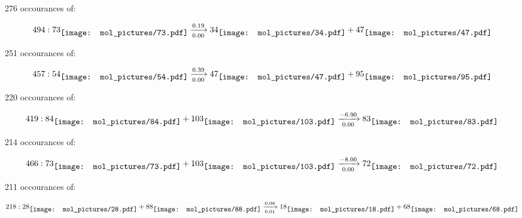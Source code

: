 \documentclass{article}
\begin{document}
\vspace{1cm}


276 occourances of:

$$
494:  
73
\raisebox{-.5\height}{\texttt{[image: mol\_pictures/73.pdf]}}
\xrightarrow[0.00]{0.19}
34
\raisebox{-.5\height}{\texttt{[image: mol\_pictures/34.pdf]}}
+
47
\raisebox{-.5\height}{\texttt{[image: mol\_pictures/47.pdf]}}
$$



\vspace{1cm}


251 occourances of:

$$
457:  
54
\raisebox{-.5\height}{\texttt{[image: mol\_pictures/54.pdf]}}
\xrightarrow[0.00]{0.39}
47
\raisebox{-.5\height}{\texttt{[image: mol\_pictures/47.pdf]}}
+
95
\raisebox{-.5\height}{\texttt{[image: mol\_pictures/95.pdf]}}
$$



\vspace{1cm}


220 occourances of:

$$
419:  
84
\raisebox{-.5\height}{\texttt{[image: mol\_pictures/84.pdf]}}
+
103
\raisebox{-.5\height}{\texttt{[image: mol\_pictures/103.pdf]}}
\xrightarrow[0.00]{-6.90}
83
\raisebox{-.5\height}{\texttt{[image: mol\_pictures/83.pdf]}}
$$



\vspace{1cm}


214 occourances of:

$$
466:  
73
\raisebox{-.5\height}{\texttt{[image: mol\_pictures/73.pdf]}}
+
103
\raisebox{-.5\height}{\texttt{[image: mol\_pictures/103.pdf]}}
\xrightarrow[0.00]{-8.00}
72
\raisebox{-.5\height}{\texttt{[image: mol\_pictures/72.pdf]}}
$$



\vspace{1cm}


211 occourances of:

$$
218:  
28
\raisebox{-.5\height}{\texttt{[image: mol\_pictures/28.pdf]}}
+
88
\raisebox{-.5\height}{\texttt{[image: mol\_pictures/88.pdf]}}
\xrightarrow[0.01]{0.08}
18
\raisebox{-.5\height}{\texttt{[image: mol\_pictures/18.pdf]}}
+
68
\raisebox{-.5\height}{\texttt{[image: mol\_pictures/68.pdf]}}
$$
\end{document}
